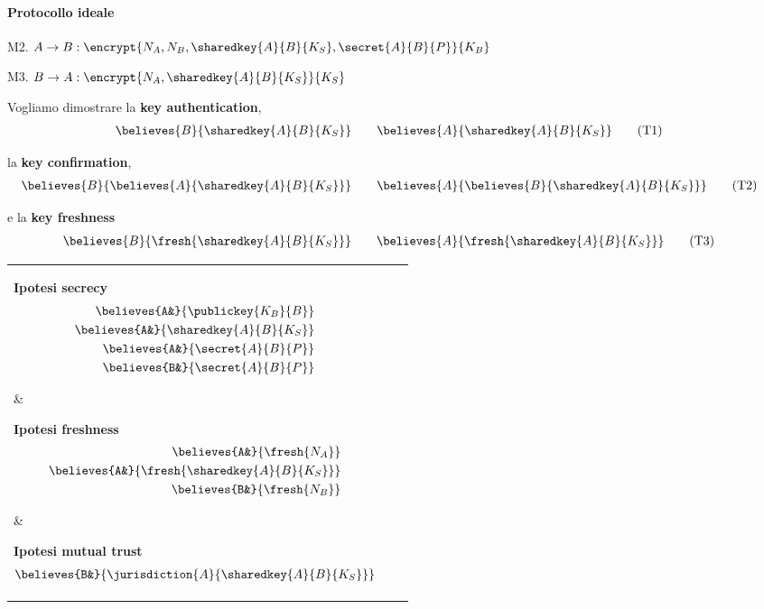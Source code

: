 \documentclass[a4paper]{article}
\begin{document}
\paragraph{Protocollo ideale}
\begin{list}{}{}
\item M2. $ A \rightarrow B: \encrypt{N_A, N_B, \sharedkey{A}{B}{K_S}, \secret{A}{B}{P}}{K_B} $
\item M3. $ B \rightarrow A: \encrypt{N_A, \sharedkey{A}{B}{K_S} }{K_S} $
\end{list}

Vogliamo dimostrare la {\bf key authentication},
\begin{align}
  \believes{B}{ \sharedkey{A}{B}{K_S} }& \qquad
  \believes{A}{ \sharedkey{A}{B}{K_S} } \tag{T1}
\end{align}

la {\bf key confirmation},
\begin{align}
  \believes{B}{ \believes{A}{ \sharedkey{A}{B}{K_S} } }& \qquad
  \believes{A}{ \believes{B}{ \sharedkey{A}{B}{K_S} } } \tag{T2}
\end{align}

e la {\bf key freshness}
\begin{align}
  \believes{B}{ \fresh{\sharedkey{A}{B}{K_S}} }& \qquad
  \believes{A}{ \fresh{\sharedkey{A}{B}{K_S}} } \tag{T3}
\end{align}


\begin{tabular}{ p{4cm} p{4cm} p{4cm} }

  \parbox[t][][t]{4cm} {
    {\bf Ipotesi secrecy}
    \begin{align}
      \believes{A&}{ \publickey{K_B}{B} }\\
      \believes{A&}{ \sharedkey{A}{B}{K_S} }\\
      \believes{A&}{ \secret{A}{B}{P} }\\
      \believes{B&}{ \secret{A}{B}{P} }
    \end{align}
  }&

  \parbox[t][][t]{4cm} {
    {\bf Ipotesi freshness}
    \begin{align}
      \believes{A&}{ \fresh{N_A} }\\
      \believes{A&}{ \fresh{\sharedkey{A}{B}{K_S}} }\\
      \believes{B&}{ \fresh{N_B} }
    \end{align}
  }&

  \parbox[t][][t]{4cm} {
    {\bf Ipotesi mutual trust}
    \begin{align}
      \believes{B&}{ \jurisdiction{A}{ \sharedkey{A}{B}{K_S} } }
    \end{align}
  }
\end{tabular} \\
\end{document}

